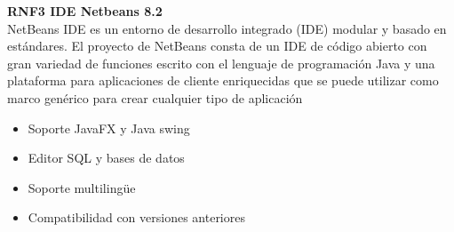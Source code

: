 \textbf{RNF3 \hspace{2cm}IDE Netbeans 8.2}\\
NetBeans IDE es un entorno de desarrollo integrado (IDE) modular y basado en estándares. El proyecto de NetBeans consta de un IDE de código abierto con gran variedad de funciones escrito con el lenguaje de programación Java y una plataforma para aplicaciones de cliente enriquecidas que se puede utilizar como marco genérico para crear cualquier tipo de aplicación
\begin{itemize}
	\item Soporte JavaFX y Java swing
	\item Editor SQL y bases de datos
	\item Soporte multilingüe
	\item Compatibilidad con versiones anteriores \\
\end{itemize}


